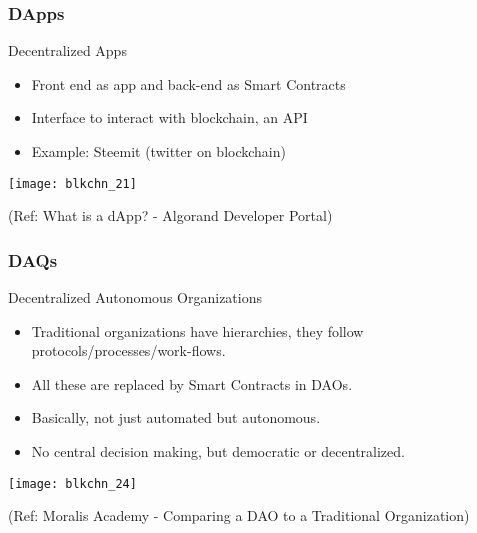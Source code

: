 \begin{frame}[fragile]\frametitle{DApps}
Decentralized Apps
\begin{itemize}
\item Front end as app and back-end as Smart Contracts
\item Interface to interact with blockchain, an API
\item Example: Steemit (twitter on blockchain)
\end{itemize}

\begin{center}
\texttt{[image: blkchn\_21]}

{\tiny (Ref: What is a dApp? - Algorand Developer Portal)}
\end{center}

\end{frame}

\begin{frame}[fragile]\frametitle{DAQs}
Decentralized Autonomous Organizations

\begin{itemize}
\item Traditional organizations have hierarchies, they follow protocols/processes/work-flows.
\item All these are replaced by Smart Contracts in DAOs. 
\item Basically, not just automated but autonomous.
\item No central decision making, but democratic or decentralized.
\end{itemize}

\begin{center}
\texttt{[image: blkchn\_24]}

{\tiny (Ref: Moralis Academy - Comparing a DAO to a Traditional Organization)}
\end{center}

\end{frame}

